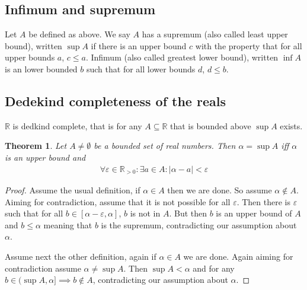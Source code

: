 \documentclass{article}
\theoremstyle{plain}
\newtheorem{theorem}{Theorem}
\theoremstyle{definition}
\begin{document}
\subsection{Infimum and supremum}
Let $A$ be defined as above. We say $A$ has a supremum (also called least upper
bound), written $\sup A$ if there is an upper bound $c$ with the property that 
for all upper bounds $a$, $c\leq a$. Infimum (also called greatest lower bound),
written $\inf A$ is an lower bounded $b$ such that for all lower bounds 
$d$, $d \leq b$.
\subsection{Dedekind completeness of the reals}
$\mathbb{R}$ is dedkind complete, that is for any $A \subseteq \mathbb{R}$ that
is bounded above $\sup A$ exists.

\begin{theorem}
	Let $A \neq \emptyset$ be a bounded set of real numbers. Then $\alpha = \sup
	A$ iff $\alpha$ is an upper bound and
\begin{align*}
	\forall \varepsilon \in \mathbb{R}_{>0}: \exists a \in A: |\alpha-a| <
	\varepsilon
\end{align*}
\end{theorem}
\begin{proof}
	Assume the usual definition, if $\alpha \in A$ then we are done. So assume
	$\alpha \notin A$. Aiming for contradiction, assume that it is not possible 
	for all $\varepsilon$. Then there is $\varepsilon$ such that
	for all $b \in [\alpha-\varepsilon,\alpha]$, $b$ is not in $A$.
	But then $b$ is an upper bound of $A$ and $b \leq \alpha$ meaning that $b$
	is the supremum, contradicting our assumption about $\alpha$.

	Assume next the other definition, again if $\alpha \in A$ we are done. Again
	aiming for contradiction assume $\alpha \neq \sup A$. Then $\sup A <
	\alpha$ and for any $b  \in (\sup A, \alpha] \implies b \notin A$,
	contradicting our assumption about $\alpha$.
\end{proof}
\end{document}
